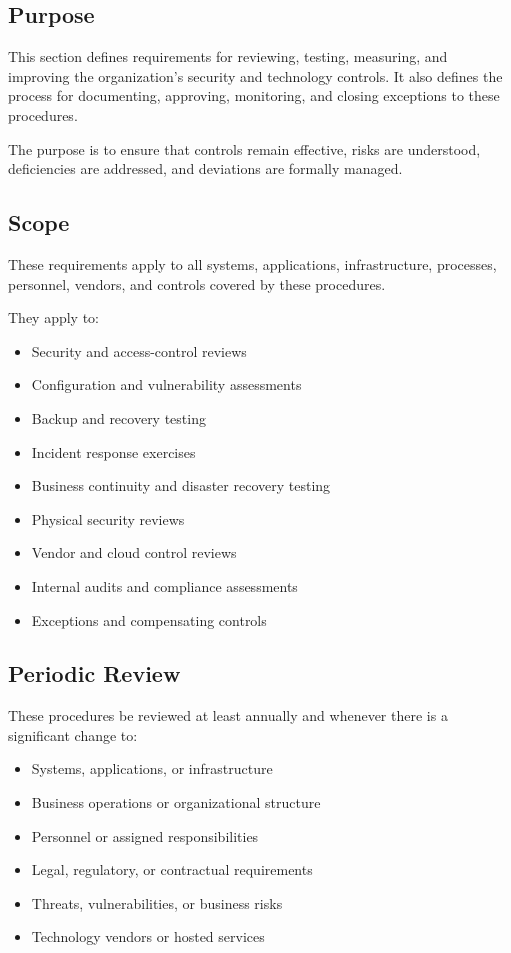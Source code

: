\subsection{Purpose}

This section defines requirements for reviewing, testing, measuring, and improving the organization's security and technology controls. It also defines the process for documenting, approving, monitoring, and closing exceptions to these procedures.

The purpose is to ensure that controls remain effective, risks are understood, deficiencies are addressed, and deviations are formally managed.

\subsection{Scope}

These requirements apply to all systems, applications, infrastructure, processes, personnel, vendors, and controls covered by these procedures.

They apply to:
\begin{itemize}
    \item Security and access-control reviews
    \item Configuration and vulnerability assessments
    \item Backup and recovery testing
    \item Incident response exercises
    \item Business continuity and disaster recovery testing
    \item Physical security reviews
    \item Vendor and cloud control reviews
    \item Internal audits and compliance assessments
    \item Exceptions and compensating controls
\end{itemize}

\subsection{Periodic Review}

These procedures \must{} be reviewed at least annually and whenever there is a significant change to:
\begin{itemize}
    \item Systems, applications, or infrastructure
    \item Business operations or organizational structure
    \item Personnel or assigned responsibilities
    \item Legal, regulatory, or contractual requirements
    \item Threats, vulnerabilities, or business risks
    \item Technology vendors or hosted services
\end{itemize}

